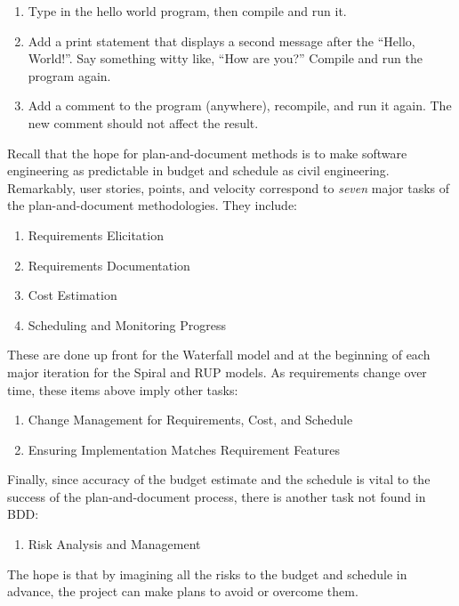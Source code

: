 \begin{enumerate}
\item Type in the hello world program, then compile and run it.

\item Add a print statement that displays a second message after the ``Hello, World!''.
Say something witty like, ``How are you?''
Compile and run the program again.

\item Add a comment to the program (anywhere), recompile, and run it again.
The new comment should not affect the result.
\end{enumerate}

Recall that the hope for plan-and-document methods is to make software engineering as predictable in budget and schedule as civil engineering. Remarkably, user stories, points, and velocity correspond to \emph{seven} major tasks of the plan-and-document methodologies. They include:
%
\begin{enumerate}
    \item Requirements Elicitation
    \item Requirements Documentation
    \item Cost Estimation
    \item Scheduling and Monitoring Progress
\end{enumerate}
%
%
These are done up front for the Waterfall model and at the beginning of each major iteration for the Spiral and RUP models. As requirements change over time,  these items above imply other tasks:
\begin{enumerate} \addtocounter{enumi}{4}
\item Change Management for Requirements, Cost, and Schedule
\item Ensuring Implementation Matches Requirement Features
\end{enumerate}
Finally, since accuracy of the budget estimate and the schedule is vital to the success of the plan-and-document process, there is another task not found in BDD:
\begin{enumerate} \addtocounter{enumi}{6}
\item Risk Analysis and Management
\end{enumerate}
The hope is that by imagining all the risks to the budget and schedule in advance, the project can make plans to avoid or overcome them.
